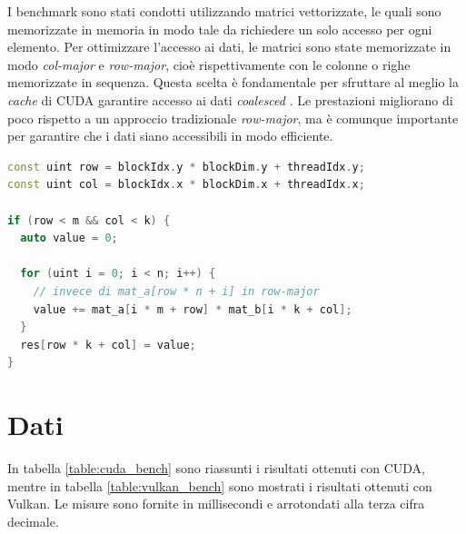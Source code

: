 \newpage


I benchmark sono stati condotti utilizzando matrici vettorizzate, le quali sono memorizzate in memoria in modo tale da richiedere un solo accesso per ogni elemento. Per ottimizzare l'accesso ai dati, le matrici sono state memorizzate in modo \textit{col-major} e \textit{row-major}, cioè rispettivamente con le colonne o righe memorizzate in sequenza. Questa scelta è fondamentale per sfruttare al meglio la \textit{cache} di \gls{CUDA} garantire accesso ai dati \textit{coalesced} \cite[]{CUDA:Massive}. Le prestazioni migliorano di poco rispetto a un approccio tradizionale \textit{row-major}, ma è comunque importante per garantire che i dati siano accessibili in modo efficiente.

\vspace{5mm}
\begin{lstlisting}[language=C++, caption=Accesso ai dati in col-major e row-major, label=lis:col-major]
const uint row = blockIdx.y * blockDim.y + threadIdx.y;
const uint col = blockIdx.x * blockDim.x + threadIdx.x;

if (row < m && col < k) {
  auto value = 0;

  for (uint i = 0; i < n; i++) {
    // invece di mat_a[row * n + i] in row-major
    value += mat_a[i * m + row] * mat_b[i * k + col];
  }
  res[row * k + col] = value;
}
\end{lstlisting}
\vspace{5mm}

\newpage
\section{Dati}

In tabella \ref{table:cuda_bench} sono riassunti i risultati ottenuti con \gls{CUDA}, mentre in tabella \ref{table:vulkan_bench} sono mostrati i risultati ottenuti con Vulkan. Le misure sono fornite in millisecondi e arrotondati alla terza cifra decimale.


